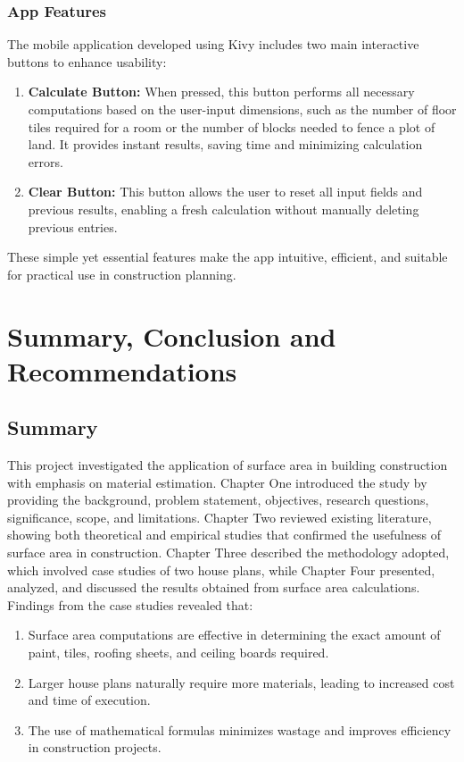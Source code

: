 \documentclass[12pt,a4paper,openany,titlepage,reqno, final]{report}
\theoremstyle{definition}
\begin{document}
	\subsection{App Features}
	
\noindent	The mobile application developed using Kivy includes two main interactive buttons to enhance usability:
	
	\begin{enumerate}
		\item \textbf{Calculate Button:} When pressed, this button performs all necessary computations based on the user-input dimensions, such as the number of floor tiles required for a room or the number of blocks needed to fence a plot of land. It provides instant results, saving time and minimizing calculation errors.
		
		\item \textbf{Clear Button:} This button allows the user to reset all input fields and previous results, enabling a fresh calculation without manually deleting previous entries.
	\end{enumerate}
\noindent These simple yet essential features make the app intuitive, efficient, and suitable for practical use in construction planning.
	
	
	\chapter{Summary, Conclusion and Recommendations}
	
	\section{Summary}
	This project investigated the application of surface area in building construction with emphasis on material estimation. Chapter One introduced the study by providing the background, problem statement, objectives, research questions, significance, scope, and limitations. Chapter Two reviewed existing literature, showing both theoretical and empirical studies that confirmed the usefulness of surface area in construction. Chapter Three described the methodology adopted, which involved case studies of two house plans, while Chapter Four presented, analyzed, and discussed the results obtained from surface area calculations. Findings from the case studies revealed that:
	\begin{enumerate}
		\item Surface area computations are effective in determining the exact amount of paint, tiles, roofing sheets, and ceiling boards required.
		\item Larger house plans naturally require more materials, leading to increased cost and time of execution.
		\item The use of mathematical formulas minimizes wastage and improves efficiency in construction projects.
	\end{enumerate}
	
\end{document}
